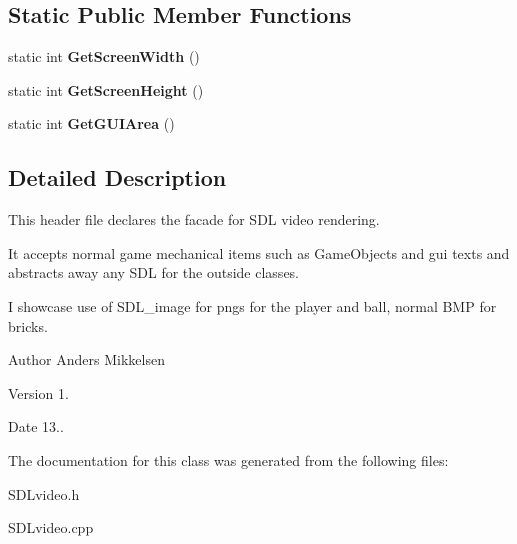 \subsection*{Static Public Member Functions}
\begin{DoxyCompactItemize}
\item 
\hypertarget{class_s_d_lvideo_a15a3bde646d6744fbb97a49b50761454}{}static int {\bfseries Get\+Screen\+Width} ()\label{class_s_d_lvideo_a15a3bde646d6744fbb97a49b50761454}

\item 
\hypertarget{class_s_d_lvideo_a267b3503399bc79c2fa2cbaff30d1361}{}static int {\bfseries Get\+Screen\+Height} ()\label{class_s_d_lvideo_a267b3503399bc79c2fa2cbaff30d1361}

\item 
\hypertarget{class_s_d_lvideo_a8a1d40aea3d2cf50e865a3413f6ea793}{}static int {\bfseries Get\+G\+U\+I\+Area} ()\label{class_s_d_lvideo_a8a1d40aea3d2cf50e865a3413f6ea793}

\end{DoxyCompactItemize}


\subsection{Detailed Description}
This header file declares the facade for S\+D\+L video rendering. 

It accepts normal game mechanical items such as Game\+Objects and gui texts and abstracts away any S\+D\+L for the outside classes.

I showcase use of S\+D\+L\+\_\+image for pngs for the player and ball, normal B\+M\+P for bricks.

\begin{DoxyAuthor}{Author}
Anders Mikkelsen 
\end{DoxyAuthor}
\begin{DoxyVersion}{Version}
1. 
\end{DoxyVersion}
\begin{DoxyDate}{Date}
13.. 
\end{DoxyDate}


The documentation for this class was generated from the following files\+:\begin{DoxyCompactItemize}
\item 
S\+D\+Lvideo.\+h\item 
S\+D\+Lvideo.\+cpp\end{DoxyCompactItemize}
